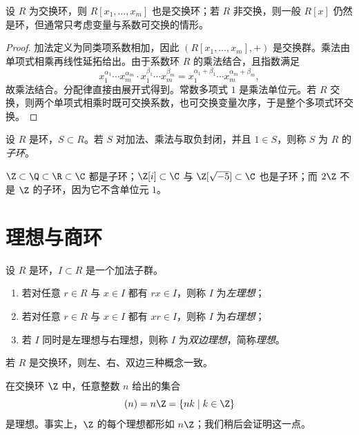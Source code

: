 \begin{proposition}
设 $R$ 为交换环，则 $R[x_1,\dots,x_m]$ 也是交换环；若 $R$ 非交换，则一般 $R[x]$ 仍然是环，但通常只考虑变量与系数可交换的情形。
\end{proposition}

\begin{proof}
加法定义为同类项系数相加，因此 $(R[x_1,\dots,x_m],+)$ 是交换群。乘法由单项式相乘再线性延拓给出。由于系数环 $R$ 的乘法结合，且指数满足
\[
x_1^{\alpha_1}\cdots x_m^{\alpha_m}\cdot x_1^{\beta_1}\cdots x_m^{\beta_m}
=x_1^{\alpha_1+\beta_1}\cdots x_m^{\alpha_m+\beta_m},
\]
故乘法结合。分配律直接由展开式得到。常数多项式 $1$ 是乘法单位元。若 $R$ 交换，则两个单项式相乘时既可交换系数，也可交换变量次序，于是整个多项式环交换。
\end{proof}

\begin{definition}
设 $R$ 是环，$S\subset R$。若 $S$ 对加法、乘法与取负封闭，并且 $1\in S$，则称 $S$ 为 $R$ 的\emph{子环}。
\end{definition}

\begin{example}
$\Z\subset \Q\subset \R\subset \C$ 都是子环；$\Z[i]\subset \C$ 与 $\Z[\sqrt{-5}]\subset \C$ 也是子环；而 $2\Z$ 不是 $\Z$ 的子环，因为它不含单位元 $1$。
\end{example}

\section{理想与商环}

\begin{definition}
设 $R$ 是环，$I\subset R$ 是一个加法子群。
\begin{enumerate}[label=\textnormal{(\arabic*)}]
  \item 若对任意 $r\in R$ 与 $x\in I$ 都有 $rx\in I$，则称 $I$ 为\emph{左理想}；
  \item 若对任意 $r\in R$ 与 $x\in I$ 都有 $xr\in I$，则称 $I$ 为\emph{右理想}；
  \item 若 $I$ 同时是左理想与右理想，则称 $I$ 为\emph{双边理想}，简称\emph{理想}。
\end{enumerate}
若 $R$ 是交换环，则左、右、双边三种概念一致。
\end{definition}

\begin{example}
在交换环 $\Z$ 中，任意整数 $n$ 给出的集合
\[
(n)=n\Z=\{nk\mid k\in \Z\}
\]
是理想。事实上，$\Z$ 的每个理想都形如 $n\Z$；我们稍后会证明这一点。
\end{example}

